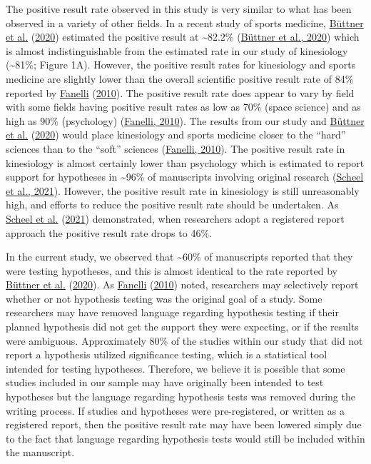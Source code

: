 \documentclass[]{cik}%
\begin{document}
The positive result rate observed in this study is very similar to what
has been observed in a variety of other fields. In a recent study of
sports medicine, \protect\hyperlink{ref-buttner_2020}{Büttner et al.}
(\protect\hyperlink{ref-buttner_2020}{2020}) estimated the positive
result at \textasciitilde82.2\%
(\protect\hyperlink{ref-buttner_2020}{Büttner et al., 2020}) which is
almost indistinguishable from the estimated rate in our study of
kinesiology (\textasciitilde81\%; Figure 1A). However, the positive
result rates for kinesiology and sports medicine are slightly lower than
the overall scientific positive result rate of 84\% reported by
\protect\hyperlink{ref-fanelli_positive_2010}{Fanelli}
(\protect\hyperlink{ref-fanelli_positive_2010}{2010}). The positive
result rate does appear to vary by field with some fields having
positive result rates as low as 70\% (space science) and as high as 90\%
(psychology) (\protect\hyperlink{ref-fanelli_positive_2010}{Fanelli,
2010}). The results from our study and
\protect\hyperlink{ref-buttner_2020}{Büttner et al.}
(\protect\hyperlink{ref-buttner_2020}{2020}) would place kinesiology and
sports medicine closer to the ``hard'' sciences than to the ``soft''
sciences (\protect\hyperlink{ref-fanelli_positive_2010}{Fanelli, 2010}).
The positive result rate in kinesiology is almost certainly lower than
psychology which is estimated to report support for hypotheses in
\textasciitilde96\% of manuscripts involving original research
(\protect\hyperlink{ref-scheel_excess_2020}{Scheel et al., 2021}).
However, the positive result rate in kinesiology is still unreasonably
high, and efforts to reduce the positive result rate should be
undertaken. As \protect\hyperlink{ref-scheel_excess_2020}{Scheel et al.}
(\protect\hyperlink{ref-scheel_excess_2020}{2021}) demonstrated, when
researchers adopt a registered report approach the positive result rate
drops to 46\%.

In the current study, we observed that \textasciitilde60\% of
manuscripts reported that they were testing hypotheses, and this is
almost identical to the rate reported by
\protect\hyperlink{ref-buttner_2020}{Büttner et al.}
(\protect\hyperlink{ref-buttner_2020}{2020}). As
\protect\hyperlink{ref-fanelli_positive_2010}{Fanelli}
(\protect\hyperlink{ref-fanelli_positive_2010}{2010}) noted, researchers
may selectively report whether or not hypothesis testing was the
original goal of a study. Some researchers may have removed language
regarding hypothesis testing if their planned hypothesis did not get the
support they were expecting, or if the results were ambiguous.
Approximately 80\% of the studies within our study that did not report a
hypothesis utilized significance testing, which is a statistical tool
intended for testing hypotheses. Therefore, we believe it is possible
that some studies included in our sample may have originally been
intended to test hypotheses but the language regarding hypothesis tests
was removed during the writing process. If studies and hypotheses were
pre-registered, or written as a registered report, then the positive
result rate may have been lowered simply due to the fact that language
regarding hypothesis tests would still be included within the
manuscript.
\end{document}
